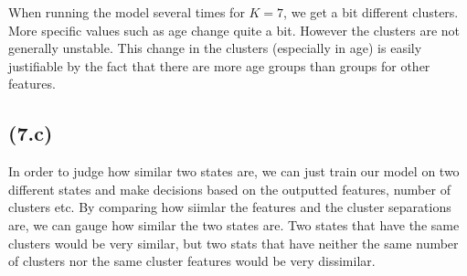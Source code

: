 \documentclass[letterpaper, 12pt]{article}
\begin{document}
 When running the model several times for $K=7$, we get a bit different clusters. More specific values such as age change quite a bit. However the clusters are not generally unstable. This change in the clusters (especially in age) is easily justifiable by the fact that there are more age groups than groups for other features.

\subsection*{(7.c)}
In order to judge how similar two states are, we can just train our model on two different states and make decisions based on the outputted features, number of clusters etc. By comparing how siimlar the features and the cluster separations are, we can gauge how similar the two states are. Two states that have the same clusters would be very similar, but two stats that have neither the same number of clusters nor the same cluster features would be very dissimilar.
\end{document}
